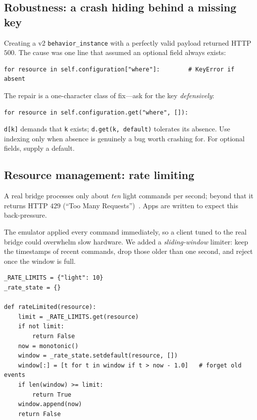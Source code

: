 \documentclass[11pt,a4paper]{article}
\newcommand{\code}[1]{\texttt{#1}}
\begin{document}
\subsection{Robustness: a crash hiding behind a missing key}

Creating a v2 \code{behavior\_instance} with a perfectly valid payload returned
HTTP $500$. The cause was one line that assumed an optional field always
exists:
\begin{lstlisting}
for resource in self.configuration["where"]:        # KeyError if absent
\end{lstlisting}
The repair is a one-character class of fix---ask for the key \emph{defensively}:
\begin{lstlisting}
for resource in self.configuration.get("where", []):
\end{lstlisting}

\begin{pitfall}
\code{d[k]} demands that \code{k} exists; \code{d.get(k, default)} tolerates its
absence. Use indexing only when absence is genuinely a bug worth crashing for.
For optional fields, supply a default.
\end{pitfall}

\subsection{Resource management: rate limiting}

\begin{specbox}
A real bridge processes only about \emph{ten} light commands per second; beyond
that it returns HTTP $429$ (``Too Many Requests'')~\cite{rfc6585,huedev}. Apps are written to expect
this back-pressure.
\end{specbox}

The emulator applied every command immediately, so a client tuned to the real
bridge could overwhelm slow hardware. We added a \emph{sliding-window} limiter:
keep the timestamps of recent commands, drop those older than one second, and
reject once the window is full.

\begin{lstlisting}
_RATE_LIMITS = {"light": 10}
_rate_state = {}

def rateLimited(resource):
    limit = _RATE_LIMITS.get(resource)
    if not limit:
        return False
    now = monotonic()
    window = _rate_state.setdefault(resource, [])
    window[:] = [t for t in window if t > now - 1.0]   # forget old events
    if len(window) >= limit:
        return True
    window.append(now)
    return False
\end{lstlisting}
\end{document}

